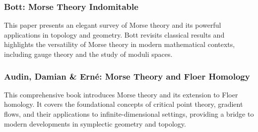 \documentclass[10pt, letterpaper]{article}
\theoremstyle{custom}
\theoremstyle{definition}
\begin{document}
\subsubsection{Bott: Morse Theory Indomitable \cite{bott1988morse}} 
This paper presents an elegant survey of Morse theory and its powerful applications in topology and geometry. Bott revisits classical results and highlights the versatility of Morse theory in modern mathematical contexts, including gauge theory and the study of moduli spaces.

\subsubsection{Audin, Damian \& Erné: Morse Theory and Floer Homology \cite{audin2014morse}} 
This comprehensive book introduces Morse theory and its extension to Floer homology. It covers the foundational concepts of critical point theory, gradient flows, and their applications to infinite-dimensional settings, providing a bridge to modern developments in symplectic geometry and topology.










\printbibliography
\end{document}
